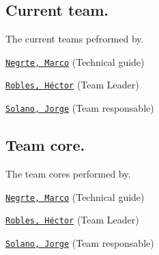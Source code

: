 \subsection*{Current team.}

The current team\textquotesingle{}s pefrormed by.


\begin{DoxyItemize}
\item \href{https://github.com/mnegretev}{\tt Negrte, Marco} (Technical guide)
\item \href{https://github.com/Hector290601}{\tt Robles, Héctor} (Team Leader)
\item \href{https://github.com/jrg-sln}{\tt Solano, Jorge} (Team responsable)
\end{DoxyItemize}

\subsection*{Team core.}

The team core\textquotesingle{}s performed by.


\begin{DoxyItemize}
\item \href{https://github.com/mnegretev}{\tt Negrte, Marco} (Technical guide)
\item \href{https://github.com/Hector290601}{\tt Robles, Héctor} (Team Leader)
\item \href{https://github.com/jrg-sln}{\tt Solano, Jorge} (Team responsable) 
\end{DoxyItemize}